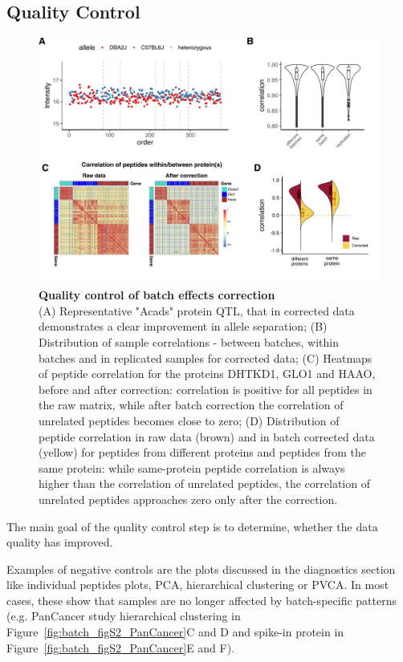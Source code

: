 \documentclass[num-refs]{wiley-article}
\begin{document}
\subsection{Quality Control}
\begin{figure}[hbt]
	\includegraphics[width=\textwidth]{figures/Fig6_quality_control2.pdf}
	
	\caption{\textbf{Quality control of batch effects correction}  \\
		\footnotesize
		(A) Representative "Acads" protein QTL, that in corrected data demonstrates a clear improvement in allele separation; (B) Distribution of sample correlations - between batches, within batches and in replicated samples for corrected data; (C)  Heatmaps of peptide correlation for the proteins DHTKD1, GLO1 and HAAO, before and after correction: correlation is positive for all peptides in the raw matrix, while after batch correction the correlation of unrelated peptides becomes close to zero; (D) Distribution of peptide correlation in raw data (brown) and in batch corrected data (yellow) for peptides from different proteins and peptides from the same protein: while same-protein peptide correlation is always higher than the correlation of unrelated peptides, the correlation of unrelated peptides approaches zero only after the correction.}
	\label{fig:batch_fig6_QualityControl}
\end{figure}


The main goal of the quality control step is to determine, whether the data quality has improved. 

Examples of negative controls are the plots discussed in the diagnostics section like individual peptides plots, PCA, hierarchical clustering or PVCA. In most cases, these show that samples are no longer affected by batch-specific patterns (e.g. PanCancer study hierarchical clustering in Figure~\ref{fig:batch_figS2_PanCancer}C and D and spike-in protein in Figure~\ref{fig:batch_figS2_PanCancer}E and F).
\end{document}
